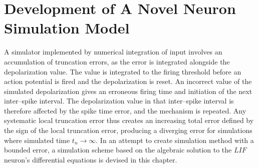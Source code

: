 \documentclass[b5paper,12 pt]{report}
\begin{document}
\chapter{Development of A Novel Neuron Simulation Model}
	\label{chapDevelopmentOfANovelModel}

A simulator implemented by numerical integration of input involves an accumulation of truncation errors, as the error is integrated alongside the depolarization value. %
The value is integrated to the firing threshold before an action potential is fired and the depolarization is reset. %
An incorrect value of the simulated depolarization gives an erroneous firing time and initiation of the next inter--spike interval.
The depolarization value in that inter--spike interval is therefore affected by the spike time error, and the mechanism is repeated.
Any systematic local truncation error thus creates an increasing total error defined by the sign of the local truncation error, producing a diverging error for simulations where simulated time $t_n \to \infty$.
In an attempt to create simulation method with a bounded error, a simulation scheme based on the algebraic solution to the $LIF$ neuron's differential equations is devised in this chapter.
\end{document}
